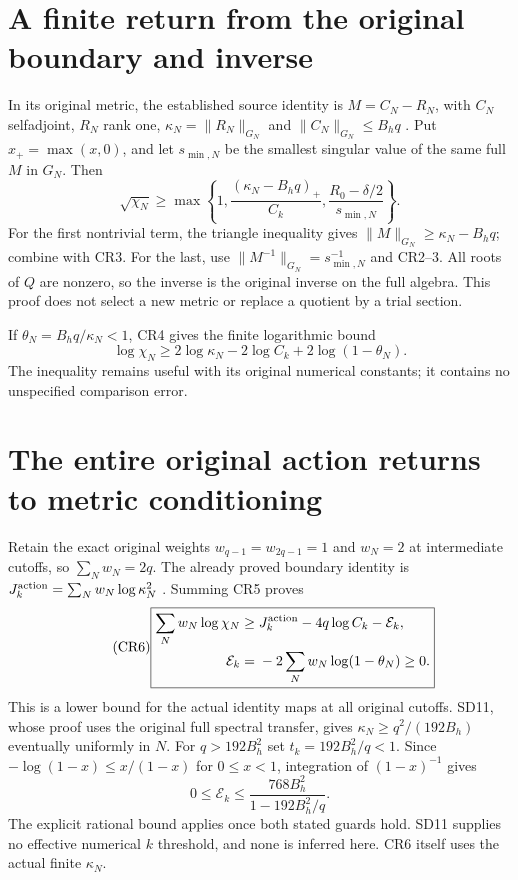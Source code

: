 \documentclass[11pt]{article}
\begin{document}
\section{A finite return from the original boundary and inverse}
In its original metric, the established source identity is
$M=C_N-R_N$, with $C_N$ selfadjoint, $R_N$ rank one,
$\kappa_N=\|R_N\|_{G_N}$ and $\|C_N\|_{G_N}\le B_hq$
\cite{CRSD}. Put $x_+=\max(x,0)$, and let $s_{\min,N}$ be the
smallest singular value of the same full $M$ in $G_N$. Then
\begin{equation}\tag{CR4}\boxed{
 \sqrt{\chi_N}\ge
 \max\left\{1,\frac{(\kappa_N-B_hq)_+}{C_k},
                  \frac{R_0-\delta/2}{s_{\min,N}}\right\}.}
\end{equation}
For the first nontrivial term, the triangle inequality gives
$\|M\|_{G_N}\ge\kappa_N-B_hq$; combine with CR3.
For the last, use $\|M^{-1}\|_{G_N}=s_{\min,N}^{-1}$ and CR2--3.
All roots of $Q$ are nonzero, so the inverse is the original inverse
on the full algebra. This proof does not select a new metric or
replace a quotient by a trial section.

If $\theta_N=B_hq/\kappa_N<1$, CR4 gives the finite logarithmic bound
\begin{equation}\tag{CR5}
 \log\chi_N\ge2\log\kappa_N-2\log C_k+2\log(1-\theta_N).
\end{equation}
The inequality remains useful with its original numerical constants;
it contains no unspecified comparison error.

\section{The entire original action returns to metric conditioning}
Retain the exact original weights $w_{q-1}=w_{2q-1}=1$ and
$w_N=2$ at intermediate cutoffs, so $\sum_Nw_N=2q$.
The already proved boundary identity is
$J_k^{\rm action}=\sum_Nw_N\log\kappa_N^2$ \cite{CRFW,CRSD}.
Summing CR5 proves
\begin{equation}\tag{CR6}\boxed{\begin{aligned}
 \sum_Nw_N\log\chi_N\ge{}&J_k^{\rm action}-4q\log C_k
                         -\mathcal E_k,\\
 \mathcal E_k={}&-2\sum_Nw_N\log(1-\theta_N)\ge0.
\end{aligned}}\end{equation}
This is a lower bound for the actual identity maps at all original
cutoffs. SD11, whose proof uses the original full spectral transfer,
gives $\kappa_N\ge q^2/(192B_h)$ eventually uniformly in $N$.
For $q>192B_h^2$ set $t_k=192B_h^2/q<1$. Since
$-\log(1-x)\le x/(1-x)$ for $0\le x<1$, integration of
$(1-x)^{-1}$ gives
\begin{equation}\tag{CR7}
 0\le\mathcal E_k\le\frac{768B_h^2}{1-192B_h^2/q}.
\end{equation}
The explicit rational bound applies once both stated guards hold.
SD11 supplies no effective numerical $k$ threshold, and none is
inferred here. CR6 itself uses the actual finite $\kappa_N$.
\end{document}
